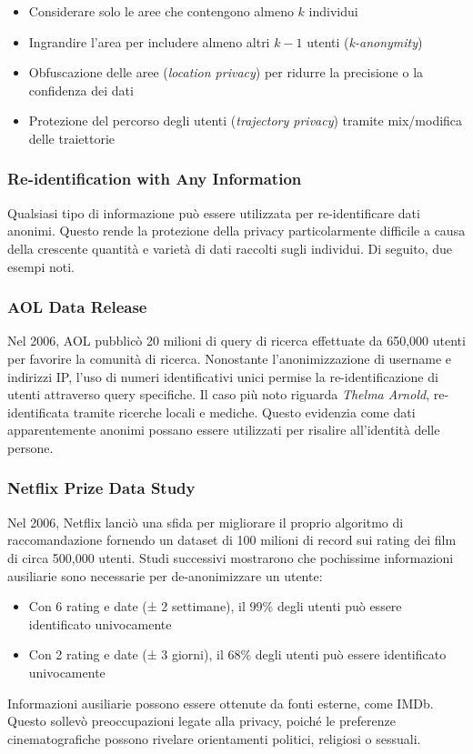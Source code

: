 \documentclass{report}
\begin{document}
\begin{itemize}
    \item Considerare solo le aree che contengono almeno $k$ individui
    \item Ingrandire l'area per includere almeno altri $k-1$ utenti (\textit{k-anonymity})
    \item Obfuscazione delle aree (\textit{location privacy}) per ridurre la precisione o la confidenza dei dati
    \item Protezione del percorso degli utenti (\textit{trajectory privacy}) tramite mix/modifica delle traiettorie
\end{itemize}

\subsubsection{ Re-identification with Any Information}
Qualsiasi tipo di informazione può essere utilizzata per re-identificare dati anonimi. Questo rende la protezione della privacy particolarmente difficile a causa della crescente quantità e varietà di dati raccolti sugli individui. Di seguito, due esempi noti.

\subsubsection{ AOL Data Release}
Nel 2006, AOL pubblicò 20 milioni di query di ricerca effettuate da 650,000 utenti per favorire la comunità di ricerca. Nonostante l'anonimizzazione di username e indirizzi IP, l'uso di numeri identificativi unici permise la re-identificazione di utenti attraverso query specifiche. 
Il caso più noto riguarda \textit{Thelma Arnold}, re-identificata tramite ricerche locali e mediche. Questo evidenzia come dati apparentemente anonimi possano essere utilizzati per risalire all'identità delle persone.

\subsubsection{ Netflix Prize Data Study}
Nel 2006, Netflix lanciò una sfida per migliorare il proprio algoritmo di raccomandazione fornendo un dataset di 100 milioni di record sui rating dei film di circa 500,000 utenti. Studi successivi mostrarono che pochissime informazioni ausiliarie sono necessarie per de-anonimizzare un utente:
\begin{itemize}
    \item Con 6 rating e date (± 2 settimane), il 99\% degli utenti può essere identificato univocamente
    \item Con 2 rating e date (± 3 giorni), il 68\% degli utenti può essere identificato univocamente
\end{itemize}
Informazioni ausiliarie possono essere ottenute da fonti esterne, come IMDb. Questo sollevò preoccupazioni legate alla privacy, poiché le preferenze cinematografiche possono rivelare orientamenti politici, religiosi o sessuali.
\end{document}
